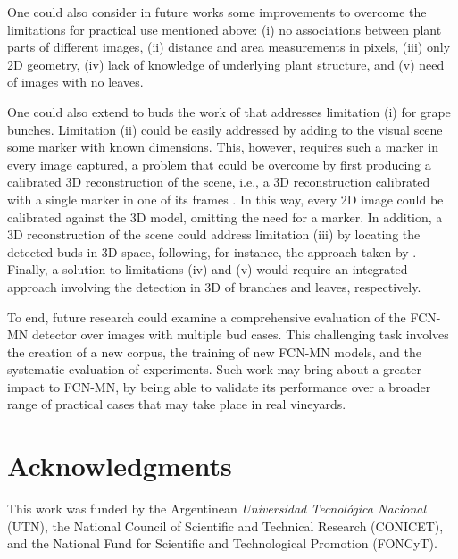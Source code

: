 \documentclass[a4paper,authoryear,review]{elsarticle}
\begin{document}
One could also consider in future works some improvements to overcome the limitations for practical use mentioned above: (i) no associations between plant parts of different images, (ii) distance and area measurements in pixels, (iii) only 2D geometry, (iv) lack of knowledge of underlying plant structure, and (v) need of images with no leaves. 

One could also extend to buds the work of \citet{santos2020grape} that addresses limitation (i) for grape bunches. Limitation (ii) could be easily addressed by adding to the visual scene some marker with known dimensions. This, however, requires such a marker in every image captured, a problem that could be overcome by first producing a calibrated 3D reconstruction of the scene, i.e., a 3D reconstruction calibrated with a single marker in one of its frames \citep{hartley2003multiple, moons20093d}. In this way, every 2D image could be calibrated against the 3D model, omitting the need for a marker. In addition, a 3D reconstruction of the scene could address limitation (iii) by locating the detected buds in 3D space, following, for instance, the approach taken by \citet{diaz2018grapevine}. Finally, a solution to limitations (iv) and (v) would require an integrated approach involving the detection in 3D of branches and leaves, respectively. 

To end, future research could examine a comprehensive evaluation of the FCN-MN detector over images with multiple bud cases. This challenging task involves the creation of a new corpus, the training of new FCN-MN models, and the systematic evaluation of experiments. Such work may bring about a greater impact to FCN-MN, by being able to validate its performance over a broader range of practical cases that may take place in real vineyards.

\section*{Acknowledgments}

This work was funded by the Argentinean \emph{Universidad Tecnológica Nacional} (UTN), the National Council of Scientific and Technical Research (CONICET), and the National Fund for Scientific and Technological Promotion (FONCyT).


\end{document}

